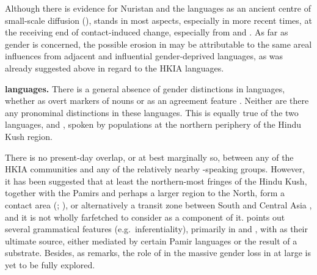 \documentclass[output=collectionpaper]{langsci/langscibook}
\begin{document}
Although there is evidence for Nuristan and the  languages as an ancient centre of small-scale diffusion (\citealt{Liljegren2017a}),  stands in most aspects, especially in more recent times, at the receiving end of contact-induced change, especially from   and  \citep[103]{Degener2002}. As far as gender is concerned, the possible erosion in  may be attributable to the same areal influences from adjacent and influential gender\hyp{}deprived  languages, as was already suggested above in regard to the HKIA  languages.

\textbf{ languages.} There is a general absence of gender distinctions in  languages, whether as overt markers of nouns or as an agreement feature \citep[530]{Kornfilt2009}. Neither are there any pronominal distinctions in these languages. This is equally true of the two  languages,  \citep{Boeschoten1998} and  \citep{Kirchner1998}, spoken by populations at the northern periphery of the Hindu Kush region.

There is no present-day overlap, or at best marginally so, between any of the HKIA communities and any of the relatively nearby -speaking groups. However, it has been suggested that at least the northern-most fringes of the Hindu Kush, together with the Pamirs and perhaps a larger region to the North, form a contact area (\citealt{Edelman1980}; \citealt[423]{Payne1989}), or alternatively a transit zone between South and Central Asia \citep[253]{Tikkanen2008}, and it is not wholly farfetched to consider  as a component of it. \citet[402--421]{Bashir1988} points out several grammatical features (e.g.\ inferentiality), primarily in  and , with  as their ultimate source, either mediated by certain  Pamir languages or the result of a  substrate. Besides, as \citet[104]{Johanson2013} remarks, the role of  in the massive gender loss in  at large is yet to be fully explored.
\end{document}
